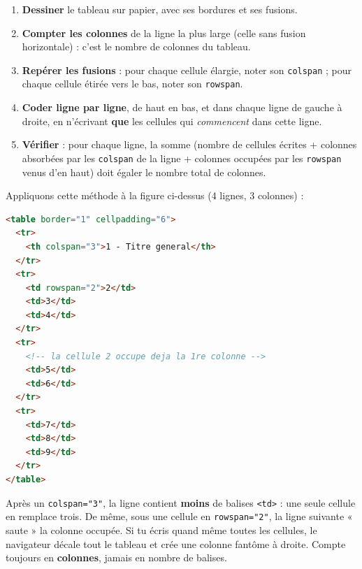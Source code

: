 \documentclass[11pt]{article}
\begin{document}
\begin{methode}
\begin{enumerate}
\item \textbf{Dessiner} le tableau sur papier, avec ses bordures et ses fusions.
\item \textbf{Compter les colonnes} de la ligne la plus large (celle sans fusion horizontale) : c'est le nombre de colonnes du tableau.
\item \textbf{Repérer les fusions} : pour chaque cellule élargie, noter son \texttt{colspan} ; pour chaque cellule étirée vers le bas, noter son \texttt{rowspan}.
\item \textbf{Coder ligne par ligne}, de haut en bas, et dans chaque ligne de gauche à droite, en n'écrivant \textbf{que} les cellules qui \emph{commencent} dans cette ligne.
\item \textbf{Vérifier} : pour chaque ligne, la somme (nombre de cellules écrites + colonnes absorbées par les \texttt{colspan} de la ligne + colonnes occupées par les \texttt{rowspan} venus d'en haut) doit égaler le nombre total de colonnes.
\end{enumerate}
\end{methode}

Appliquons cette méthode à la figure ci-dessus (4 lignes, 3 colonnes) :

\begin{lstlisting}[language=HTML]
<table border="1" cellpadding="6">
  <tr>
    <th colspan="3">1 - Titre general</th>
  </tr>
  <tr>
    <td rowspan="2">2</td>
    <td>3</td>
    <td>4</td>
  </tr>
  <tr>
    <!-- la cellule 2 occupe deja la 1re colonne -->
    <td>5</td>
    <td>6</td>
  </tr>
  <tr>
    <td>7</td>
    <td>8</td>
    <td>9</td>
  </tr>
</table>
\end{lstlisting}

\begin{attention}
Après un \texttt{colspan="3"}, la ligne contient \textbf{moins} de balises \texttt{<td>} : une seule cellule en remplace trois. De même, sous une cellule en \texttt{rowspan="2"}, la ligne suivante « saute » la colonne occupée. Si tu écris quand même toutes les cellules, le navigateur décale tout le tableau et crée une colonne fantôme à droite. Compte toujours en \textbf{colonnes}, jamais en nombre de balises.
\end{attention}
\end{document}
